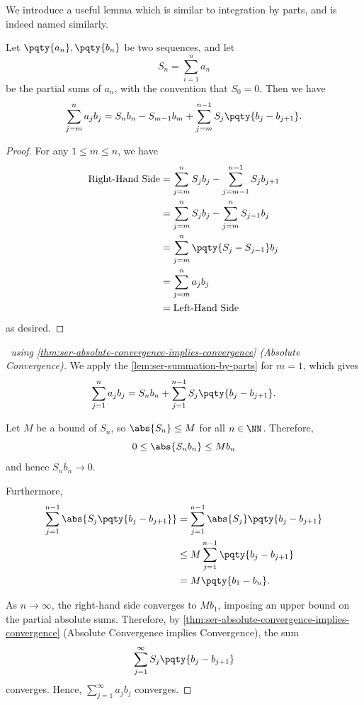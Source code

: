 We introduce a useful lemma which is similar to integration by parts, and is indeed named similarly.

\begin{lemma}
    \label{lem:ser-summation-by-parts}%
    Let \(\pqty{a_n}, \pqty{b_n}\) be two sequences, and let
    \[
        S_n = \sum_{i = 1}^{n} a_n
    \]
    be the partial sums of \(a_n\), with the convention that \(S_0 = 0\). Then we have
    \[
        \sum_{j = m}^{n} a_j b_j = S_n b_n - S_{m - 1} b_m + \sum_{j = m}^{n - 1} S_j \pqty{b_j - b_{j + 1}}.
    \]
\end{lemma}

\begin{proof}
    For any \(1 \leq m \leq n\), we have
    \begin{align*}
        \text{Right-Hand Side} &= \sum_{j = m}^{n} S_j b_j - \sum_{j = m - 1}^{n - 1} S_j b_{j + 1} \\
        &= \sum_{j = m}^{n} S_j b_j - \sum_{j = m}^{n} S_{j - 1} b_j \\
        &= \sum_{j = m}^{n} \pqty{S_j - S_{j - 1}} b_j \\
        &= \sum_{j = m}^{n} a_j b_j \\
        &= \text{Left-Hand Side}
    \end{align*}
    as desired.
\end{proof}

\begin{proof}[\proofname\ using \autoref{thm:ser-absolute-convergence-implies-convergence} (Absolute Convergence)]
    We apply the \autoref{lem:ser-summation-by-parts} for \(m = 1\), which gives
    \[
        \sum_{j = 1}^{n} a_j b_j = S_n b_n + \sum_{j = 1}^{n - 1} S_j \pqty{b_j - b_{j + 1}}.
    \]

    Let \(M\) be a bound of \(S_n\), so \(\abs{S_n} \leq M\) for all \(n \in \NN\). Therefore,
    \[
        0 \leq \abs{S_n b_n} \leq M b_n
    \]
    and hence \(S_n b_n \to 0\).

    Furthermore,
    \begin{align*}
        \sum_{j = 1}^{n - 1} \abs{S_j \pqty{b_j - b_{j + 1}}} &= \sum_{j = 1}^{n - 1} \abs{S_j} \pqty{b_j - b_{j + 1}} \\
        &\leq M \sum_{j = 1}^{n - 1} \pqty{b_j - b_{j + 1}} \\
        &= M \pqty{b_1 - b_n}.
    \end{align*}

    As \(n \to \infty\), the right-hand side converges to \(M b_1\), imposing an upper bound on the partial absolute sums. Therefore, by \autoref{thm:ser-absolute-convergence-implies-convergence} (Absolute Convergence implies Convergence), the sum
    \[
        \sum_{j = 1}^{\infty} S_j \pqty{b_j - b_{j + 1}}
    \]
    converges. Hence, \(\sum_{j = 1}^{\infty} a_j b_j\) converges.
\end{proof}

